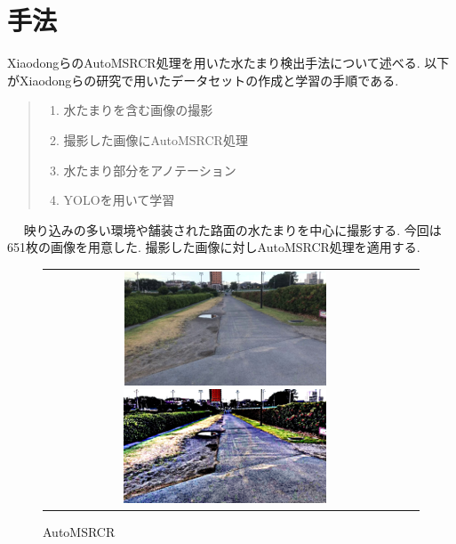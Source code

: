 \documentclass[10pt]{jarticle}
\begin{document}
    \section{手法}%
        XiaodongらのAutoMSRCR処理を用いた水たまり検出手法について述べる. 
    以下がXiaodongらの研究で用いたデータセットの作成と学習の手順である. 
    \begin{quote}
        \begin{enumerate}
         \item 水たまりを含む画像の撮影
         \item 撮影した画像にAutoMSRCR処理
         \item 水たまり部分をアノテーション
         \item YOLOを用いて学習
        \end{enumerate}
       \end{quote}
    映り込みの多い環境や舗装された路面の水たまりを中心に撮影する. 今回は651枚の画像を用意した. 
    撮影した画像に対しAutoMSRCR処理を適用する. 
    \begin{figure}[H]
        \begin{tabular}{cc}
            \begin{minipage}{.1\textwidth}
                \centering
                \includegraphics[width=2.0\linewidth]{./fig/fig1.png}
                \vspace{-10mm}\caption{Original}
                \label{fig_first}
            \end{minipage}
            \begin{minipage}{.5\textwidth}
                \centering
                \includegraphics[width=0.4\linewidth]{./fig/fig2.png}
                \vspace{-5mm}\caption{AutoMSRCR}
                \label{fig_second}
            \end{minipage}
        \end{tabular}
    \end{figure}
\end{document}
